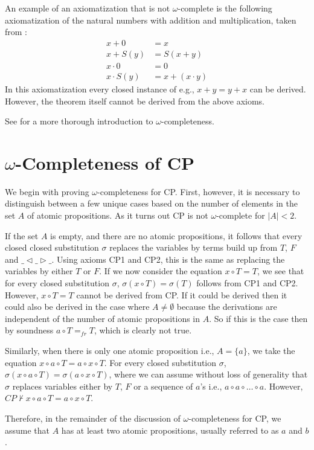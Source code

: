 \documentclass[a4paper,twoside,openright]{report}
\newcommand{\lef}{\ensuremath{\triangleleft}}
\newcommand{\rig}{\ensuremath{\triangleright}}
\begin{document}
An example of an axiomatization that is not $\omega$-complete is the following axiomatization of the natural numbers with addition and multiplication, taken from \cite{omega_bergstra}:
\begin{align*}
x + 0 &= x\\
x + S(y) &= S(x+y)\\
x\cdot 0 &= 0\\
x\cdot S(y) &= x + (x\cdot y)
\end{align*}
In this axiomatization every closed instance of e.g., $x+y=y+x$ can be derived. However, the theorem itself cannot be derived from the above axioms.

See \cite{omega} for a more thorough introduction to $\omega$-completeness.

\section{$\omega$-Completeness of CP}

We begin with proving $\omega$-completeness for CP. First, however, it is necessary to distinguish between a few unique cases based on the number of elements in the set $A$ of atomic propositions. As it turns out CP is not $\omega$-complete for $|A|<2$.

If the set $A$ is empty, and there are no atomic propositions, it follows that every closed closed substitution $\sigma$ replaces the variables by terms build up from $T$, $F$ and $\_\lef \_\rig \_$. Using axioms CP1 and CP2, this is the same as replacing the variables by either $T$ or $F$. If we now consider the equation $x\circ T=T$, we see that for every closed substitution $\sigma$, $\sigma(x\circ T)=\sigma(T)$ follows from CP1 and CP2. However, $x\circ T=T$ cannot be derived from CP. If it could be derived then it could also be derived in the case where $A\ne\emptyset$ because the derivations are independent of the number of atomic propositions in $A$. So if this is the case then by soundness $a\circ T=_{fr}T$, which is clearly not true.

Similarly, when there is only one atomic proposition i.e., $A=\{a\}$, we take the equation $x\circ a\circ T=a\circ x\circ T$. For every closed substitution $\sigma$, $\sigma(x\circ a\circ T)=\sigma(a\circ x\circ T)$, where we can assume without loss of generality that $\sigma$ replaces variables either by $T$, $F$ or a sequence of $a$'s i.e., $a\circ a\circ\ldots\circ a$.  However, $CP\nvdash x\circ a\circ T=a\circ x\circ T$.

Therefore, in the remainder of the discussion of $\omega$-completeness for CP, we assume that $A$ has at least two atomic propositions, usually referred to as $a$ and $b$.
\end{document}
